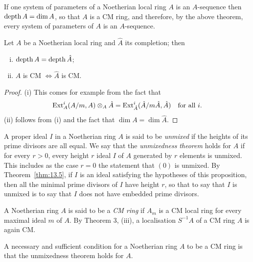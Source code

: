 If one system of parameters of a Noetherian local ring $A$ is an $A$-sequence
then $\operatorname{depth} A = \dim A$, so that $A$ is a CM ring, and therefore, by the above
theorem, every system of parameters of $A$ is an $A$-sequence.

\begin{theorem}\label{thm:17.5}
Let $A$ be a Noetherian local ring and $\hat{A}$ its completion;
then
\begin{enumerate}[(i)]
  \item $\operatorname{depth} A = \operatorname{depth} \hat{A}$;
  \item $A$ is CM $\iff \hat{A}$ is CM.
\end{enumerate}
\end{theorem}

\begin{proof}
(i) This comes for example from the fact that
\[
  \operatorname{Ext}^i_A(A/m, A) \otimes_A \hat{A} = \operatorname{Ext}^i_{\hat{A}}(\hat{A}/m\hat{A}, \hat{A}) \quad \text{for all } i.
\]
(ii) follows from (i) and the fact that
$\dim A = \dim \hat{A}$.
\end{proof}

\begin{definition}
A proper ideal $I$ in a Noetherian ring $A$ is said to be \emph{unmixed}
if the heights of its prime divisors are all equal. We say that the \emph{unmixedness}
\emph{theorem} holds for $A$ if for every $r > 0$, every height $r$ ideal $I$ of $A$ generated
by $r$ elements is unmixed. This includes as the case $r = 0$ the statement
that $(0)$ is unmixed. By Theorem~\ref{thm:13.5}, if $I$ is an ideal satisfying the
hypotheses of this proposition, then all the minimal prime divisors of $I$
have height $r$, so that to say that $I$ is unmixed is to say that $I$ does not
have embedded prime divisors.
\end{definition}

A Noetherian ring $A$ is said to be a \emph{CM ring} if $A_m$ is a CM local
ring for every maximal ideal $m$ of $A$. By Theorem 3, (iii), a localisation
$S^{-1}A$ of a CM ring $A$ is again CM.

\begin{theorem}\label{thm:17.6}
A necessary and sufficient condition for a Noetherian ring
$A$ to be a CM ring is that the unmixedness theorem holds for $A$.
\end{theorem}


